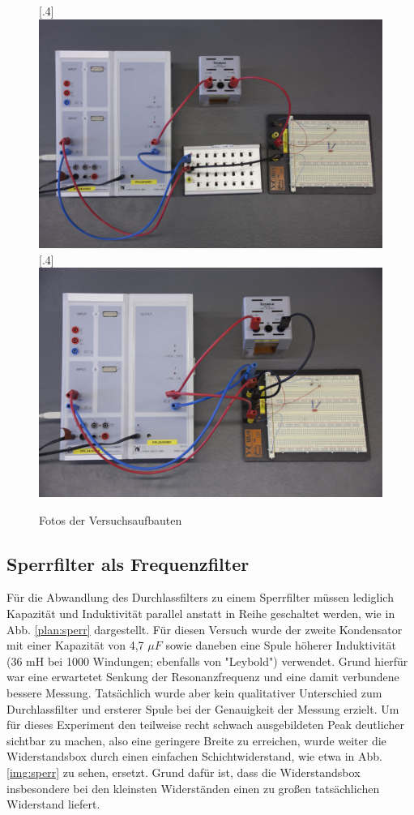 \begin{figure}[h]
\centering
    [.4\linewidth]
            {\includegraphics[width=.4\textwidth]{images/durchlassfilter.jpg}}
    [.4\linewidth]
            {\includegraphics[width=.4\textwidth]{images/sperrfilter.jpg}}
\caption{Fotos der Versuchsaufbauten}
\end{figure}

\subsection{Sperrfilter als Frequenzfilter}
Für die Abwandlung des Durchlassfilters zu einem Sperrfilter müssen lediglich Kapazität und Induktivität parallel anstatt in Reihe geschaltet werden, wie in Abb. \ref{plan:sperr} dargestellt. Für diesen Versuch wurde der zweite Kondensator mit einer Kapazität von 4,7 $  \mu F $ sowie daneben eine Spule höherer Induktivität (36 mH bei 1000 Windungen; ebenfalls von "Leybold") verwendet. Grund hierfür war eine erwartetet Senkung der Resonanzfrequenz und eine damit verbundene bessere Messung. Tatsächlich wurde aber kein qualitativer Unterschied zum Durchlassfilter und ersterer Spule 
bei der Genauigkeit der Messung erzielt. Um für dieses Experiment den teilweise recht schwach ausgebildeten Peak deutlicher sichtbar zu machen, also eine geringere Breite zu erreichen, wurde weiter die Widerstandsbox durch einen einfachen Schichtwiderstand, wie etwa in Abb. \ref{img:sperr} zu sehen,
ersetzt. Grund dafür ist, dass die Widerstandsbox insbesondere bei den kleinsten Widerständen einen zu großen tatsächlichen Widerstand liefert.



